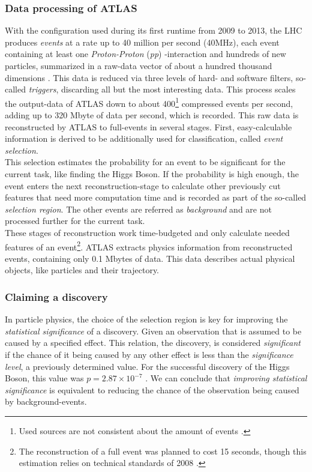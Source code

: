\subsubsection{Data processing of ATLAS}
With the configuration used during its first runtime from 2009 to 2013, the LHC produces \emph{events} at a rate up to 40 million per second (40MHz), each event containing at least one \emph{Proton-Proton} (\emph{pp}) -interaction and hundreds of new particles, summarized in a raw-data vector of about a hundred thousand dimensions \cite{higgsPaper}. This data is reduced via three levels of hard- and software filters, so-called \emph{triggers}, discarding all but the most interesting data. This process scales the output-data of ATLAS down to about 400\footnote{Used sources are not consistent about the amount of events \cite{higgsPaper, glig14, atlasHP}.} compressed events per second, adding up to 320 Mbyte of data per second, which is recorded. This raw data is reconstructed by ATLAS to full-events in several stages. First, easy-calculable information is derived to be additionally used for classification, called \emph{event selection}.\\
This selection estimates the probability for an event to be significant for the current task, like finding the Higgs Boson. If the probability is high enough, the event enters the next reconstruction-stage to calculate other previously cut features that need more computation time and is recorded as part of the  so-called \emph{selection region}. The other events are referred as \emph{background} and are not processed further for the current task.\\
These stages of reconstruction work time-budgeted and only calculate needed features of an event\footnote{The reconstruction of a full event was planned to cost 15 seconds, though this estimation relies on technical standards of 2008 \cite{atlasHP}.}.
ATLAS extracts physics information from reconstructed events, containing only 0.1 Mbytes of data. This data describes actual physical objects, like particles and their trajectory.

\subsubsection{Claiming a discovery}
In particle physics, the choice of the selection region is key for improving the \emph{statistical significance} of a discovery. Given an observation that is assumed to be caused by a specified effect. This relation, the discovery, is considered \emph{significant} if the chance of it being caused by any other effect is less than the \emph{significance level}, a previously determined value. For the successful discovery of the Higgs Boson, this value was $p = 2.87 \times 10^{-7}$ \cite{higgsPaper}. We can conclude that \emph{improving statistical significance} is equivalent to reducing the chance of the observation being caused by background-events.

